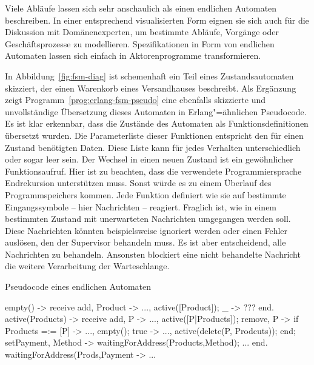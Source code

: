 Viele Abläufe lassen sich sehr anschaulich als einen endlichen Automaten beschreiben. In einer entsprechend visualisierten Form eignen sie sich auch für die Diskussion mit Domänenexperten, um bestimmte Abläufe, Vorgänge oder Geschäftsprozesse zu modellieren. Spezifikationen in Form von endlichen Automaten lassen sich einfach in Aktorenprogramme transformieren.

In Abbildung~\ref{fig:fsm-diag} ist schemenhaft ein Teil eines Zustandsautomaten skizziert, der einen Warenkorb eines Versandhauses beschreibt. Als Ergänzung zeigt Programm~\ref{prog:erlang-fsm-pseudo} eine ebenfalls skizzierte und unvollständige Übersetzung dieses Automaten in Erlang"=ähnlichen Pseudocode. Es ist klar erkennbar, dass die Zustände des Automaten als Funktionsdefinitionen übersetzt wurden. Die Parameterliste dieser Funktionen entspricht den für einen Zustand benötigten Daten. Diese Liste kann für jedes Verhalten unterschiedlich oder sogar leer sein. Der Wechsel in einen neuen Zustand ist ein gewöhnlicher Funktionsaufruf. Hier ist zu beachten, dass die verwendete Programmiersprache Endrekursion unterstützen muss. Sonst würde es zu einem Überlauf des Programmspeichers kommen. Jede Funktion definiert wie sie auf bestimmte Eingangssymbole -- hier Nachrichten --  reagiert. Fraglich ist, wie in einem bestimmten Zustand mit unerwarteten Nachrichten umgegangen werden soll. Diese Nachrichten könnten beispielsweise ignoriert werden oder einen Fehler auslösen, den der Supervisor behandeln muss. Es ist aber entscheidend, alle Nachrichten zu behandeln. Ansonsten blockiert eine nicht behandelte Nachricht die weitere Verarbeitung der Warteschlange.

\begin{program}[!hbt]
\caption{Pseudocode eines endlichen Automaten}
\label{prog:erlang-fsm-pseudo}
\begin{ErlangCode}
empty() ->
	receive
		{ add, Product } -> ..., active([Product]);
		_ -> ??? %
	end.
active(Products) ->
	receive
		{ add, P } -> ..., active([P|Products]);
		{ remove, P } -> if Products =:= [P] -> ..., empty();
												true -> ..., active(delete(P, Prodcuts));
										 end;
		{ setPayment, Method } -> waitingForAddress({Products,Method});
		...
	end.
waitingForAddress({Prods,Payment} -> ...
\end{ErlangCode}
\end{program}


